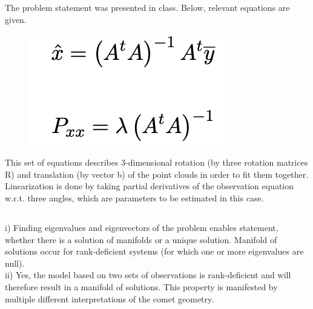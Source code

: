 \subsection{}
The problem statement was presented in class. Below, relevant equations are given. 
\begin{figure}[H]
		\centering
		\includegraphics[width=0.2\linewidth]{eq2.png}
\end{figure}
This set of equations describes 3-dimensional rotation (by three rotation matrices R) and translation (by vector b) of the point clouds in order to fit them together. Linearization is done by taking partial derivatives of the observation equation w.r.t. three angles, which are parameters to be estimated in this case.



\subsection{}
i) Finding eigenvalues and eigenvectors of the problem enables statement, whether there is a solution of manifolds or a unique solution. Manifold of solutions occur for rank-deficient systems (for which one or more eigenvalues are null).\\
ii) Yes, the model based on two sets of observations is rank-deficient and will therefore result in a manifold of solutions. This property is manifested by multiple different interpretations of the comet geometry. 


    
